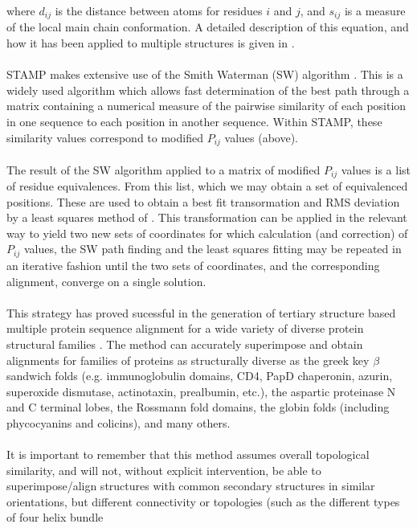 where $d_{ij}$ is the distance between \Cal atoms for residues $i$
and $j$, and $s_{ij}$ is a measure of the local main chain conformation.
A detailed description of this equation, and how it has been
applied to multiple structures is given in \cite{rb92b}. \\
\\
STAMP makes extensive use of the Smith Waterman (SW) algorithm 
\cite{smith81,barton94,timewarps}.  This is a widely used algorithm 
which allows fast determination of the best path through a matrix 
containing a numerical measure of the pairwise similarity of each 
position in one sequence to each position in another sequence.  Within 
STAMP, these similarity values correspond to modified $P_{ij}$ 
values (above).\\
\\
The result of the SW algorithm applied to a matrix of modified $P_{ij}$
values is a list of residue equivalences.  From this list, which
we may obtain a set of equivalenced \Cal positions.  These are
used to obtain a best fit transormation and RMS deviation by a
least squares method of \cite{kabsch78,mclachlan79}.  This
transformation can be applied in the relevant way to yield two
new sets of coordinates for which calculation (and correction) of
$P_{ij}$ values, the SW path finding and the least squares fitting may
be repeated in an iterative fashion until the two sets of
coordinates, and the corresponding alignment, converge on a
single solution.\\
\\
This strategy has proved sucessful in the generation of tertiary
structure based multiple protein sequence alignment for a wide
variety of diverse protein structural families 
\cite{rb92b,rb93b,rb93c,rb94,russell94}.  
The method can accurately superimpose and obtain alignments for families 
of proteins as structurally diverse as the greek key $\beta$ sandwich 
folds (e.g. immunoglobulin domains, CD4, PapD chaperonin, 
azurin, superoxide dismutase, actinotaxin, prealbumin, etc.), the
aspartic proteinase N and C terminal lobes, the Rossmann
fold domains, the globin folds (including phycocyanins and
colicins), and many others.\\
\\
It is important to remember that this method assumes overall
topological similarity, and will not, without explicit
intervention,  be able to superimpose/align structures with common
secondary structures in similar orientations, but different
connectivity or topologies (such as the different types of four helix bundle
